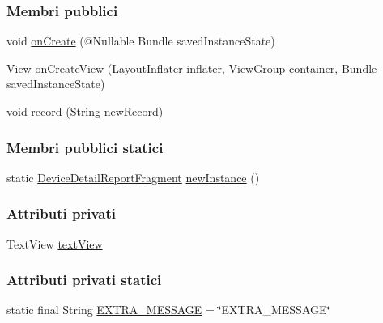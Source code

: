 \subsubsection*{Membri pubblici}
\begin{DoxyCompactItemize}
\item 
void \hyperlink{classit_1_1unibo_1_1torsello_1_1bluetoothpositioning_1_1fragment_1_1DeviceDetailReportFragment_a96859a689bc31c69a329d6f2b198c860_a96859a689bc31c69a329d6f2b198c860}{on\+Create} (@Nullable Bundle saved\+Instance\+State)
\item 
View \hyperlink{classit_1_1unibo_1_1torsello_1_1bluetoothpositioning_1_1fragment_1_1DeviceDetailReportFragment_a5aa4df017085deeac5a427fcc63a4fc9_a5aa4df017085deeac5a427fcc63a4fc9}{on\+Create\+View} (Layout\+Inflater inflater, View\+Group container, Bundle saved\+Instance\+State)
\item 
void \hyperlink{classit_1_1unibo_1_1torsello_1_1bluetoothpositioning_1_1fragment_1_1DeviceDetailReportFragment_ae9615d2a2096700befd416d0d8a95f85_ae9615d2a2096700befd416d0d8a95f85}{record} (String new\+Record)
\end{DoxyCompactItemize}
\subsubsection*{Membri pubblici statici}
\begin{DoxyCompactItemize}
\item 
static \hyperlink{classit_1_1unibo_1_1torsello_1_1bluetoothpositioning_1_1fragment_1_1DeviceDetailReportFragment}{Device\+Detail\+Report\+Fragment} \hyperlink{classit_1_1unibo_1_1torsello_1_1bluetoothpositioning_1_1fragment_1_1DeviceDetailReportFragment_a91531900ca550e51463fe827be0d5851_a91531900ca550e51463fe827be0d5851}{new\+Instance} ()
\end{DoxyCompactItemize}
\subsubsection*{Attributi privati}
\begin{DoxyCompactItemize}
\item 
Text\+View \hyperlink{classit_1_1unibo_1_1torsello_1_1bluetoothpositioning_1_1fragment_1_1DeviceDetailReportFragment_a6f00cf8dad82dcd8d6371db58c2235cf_a6f00cf8dad82dcd8d6371db58c2235cf}{text\+View}
\end{DoxyCompactItemize}
\subsubsection*{Attributi privati statici}
\begin{DoxyCompactItemize}
\item 
static final String \hyperlink{classit_1_1unibo_1_1torsello_1_1bluetoothpositioning_1_1fragment_1_1DeviceDetailReportFragment_a906b92cc5a18c57393f96a1fbc1dec15_a906b92cc5a18c57393f96a1fbc1dec15}{E\+X\+T\+R\+A\+\_\+\+M\+E\+S\+S\+A\+GE} = \char`\"{}E\+X\+T\+R\+A\+\_\+\+M\+E\+S\+S\+A\+GE\char`\"{}
\end{DoxyCompactItemize}


